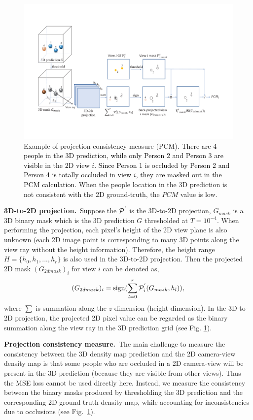 \documentclass[letterpaper]{article}
\DeclareMathOperator{\sign}{sign}
\newcommand{\zq}[1]{\textcolor{black}{#1}} %
\begin{document}
\begin{figure}[t]
\centering
   \includegraphics[width=0.95\columnwidth]{Fig_pcm.pdf}
   \caption{Example of projection consistency measure (PCM). \zq{There are 4 people in the 3D prediction, while only Person 2 and Person 3 are visible in the 2D view $i$. Since Person 1 is occluded by Person 2 and Person 4 is totally occluded in view $i$, they are masked out in the PCM calculation.} When the people location in the 3D prediction is not consistent with the 2D ground-truth, the $PCM$ value is low.
   }
\label{fig:pcm}
\end{figure}


\textbf{3D-to-2D projection.}~Suppose the $\cal P^{'}$ is the 3D-to-2D projection, $G_{mask}$ is a 3D binary mask which is the 3D prediction $G$ thresholded at $T=10^{-4}$. When performing the projection, each pixel's height of the 2D view plane is also unknown (each 2D image point is corresponding to many 3D points along the view ray without the height information). Therefore, the height range $H = \{h_0, h_1, ..., h_r\}$ is also used in the 3D-to-2D projection. Then the projected 2D mask $(G_{2dmask})_{i}$ for view $i$ can be denoted as,
\begin{align}
      \zq{(G_{2dmask})_{i}  = \sign(\sum^r_{l=0}{\cal P}^{'}_i (G_{mask}, h_l)),}
\end{align}
where $\sum$ is summation along the $z$-dimension (height dimension). In the 3D-to-2D projection, the projected 2D pixel value can be regarded as the binary summation along the view ray in the 3D prediction grid (see Fig. \ref{fig:pcm}).

\textbf{Projection consistency measure.}~The main challenge to measure the consistency between the 3D density map prediction and the 2D camera-view density map is that some people who are occluded in a 2D camera-view will be present in the 3D prediction (because they are visible from other views).  Thus the MSE loss cannot be used directly here.
Instead, we measure the consistency between the binary masks produced by thresholding %
the 3D prediction and the corresponding  2D ground-truth density map, while accounting for inconsistencies due to occlusions (see Fig.~\ref{fig:pcm}).
\end{document}
